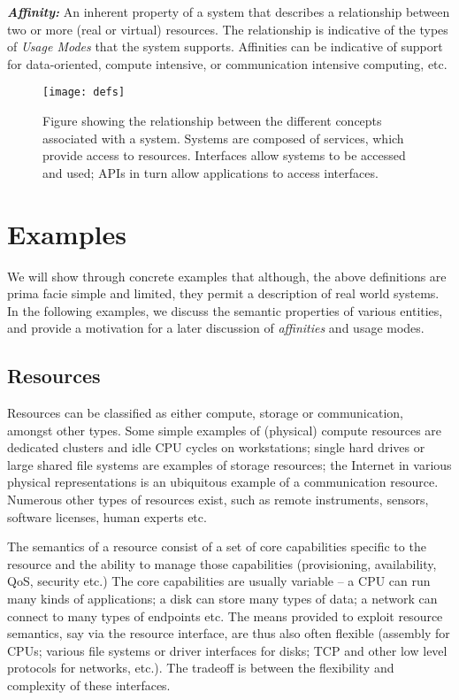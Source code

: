 \documentclass[conference,final]{IEEEtran}
\newcommand{\I}[1]{\textit{#1}}
\newcommand{\BI}[1]{\textbf{\textit{#1}}}
\begin{document}
 \BI{Affinity:} An inherent property of a system that describes a
 relationship between two or more (real or virtual) resources.  The
 relationship is indicative of the types of \I{Usage Modes} that the
 system supports.  Affinities can be indicative of support for
 data-oriented, compute intensive, or communication intensive
 computing, etc. 

 \begin{figure}[ht!]
  \begin{center}
   \texttt{[image: defs]}
   \caption{Figure showing the relationship between the different
     concepts associated with a system. Systems are composed of
     services, which provide access to resources.  Interfaces allow
     systems to be accessed and used; APIs in turn allow applications 
     to access interfaces.}
   \label{fig:defs}
  \end{center}
 \end{figure}

\section{Examples}

 We will show through concrete examples that although, the above
 definitions are prima facie simple and limited, they permit a
 description of real world systems. In the following examples, we
 discuss the semantic properties of various entities, and provide a
 motivation for a later discussion of {\it affinities} and usage
 modes.

 \subsection{Resources}

  Resources can be classified as either compute, storage or
  communication, amongst other types.  Some simple examples of
  (physical) compute resources are dedicated clusters and idle CPU
  cycles on workstations; single hard drives or large shared file
  systems are examples of storage resources; the Internet in various
  physical representations is an ubiquitous example of a communication
  resource.  Numerous other types of resources exist, such as remote
  instruments, sensors, software licenses, human experts etc. 
  
  The semantics of a resource consist of a set of core capabilities
  specific to  the resource and the ability to manage those
  capabilities (provisioning, availability, QoS, security etc.)  The
  core capabilities are usually variable -- a CPU can run many kinds
  of applications; a disk can store many types of data; a network can
  connect to many types of endpoints etc. The means provided to
  exploit resource semantics, say via the resource interface, are thus
  also often flexible (assembly for CPUs; various file systems or
  driver interfaces for disks; TCP and other low level protocols for
  networks, etc.).  The tradeoff is between the flexibility and
  complexity of these interfaces.
\end{document}

